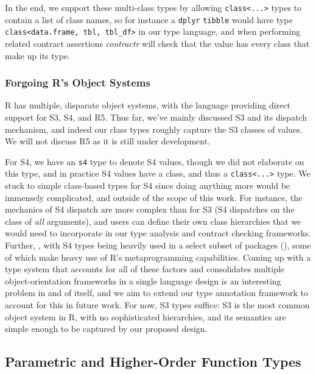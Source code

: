 \documentclass[acmsmall,review,anonymous]{acmart}\settopmatter{printfolios=true,printccs=false,printacmref=false}
\newcommand{\code}[1]{{\lstinline[style=Rin]!#1!}\xspace}
\newcommand{\contractr}{\emph{contractr}\xspace} %
\begin{document}
In the end, we support these multi-class types by allowing \code{class<...>} types to contain a list of class names, so for instance a \code{dplyr} \code{tibble} would have type \code{class<data.frame, tbl, tbl_df>} in our type language, and when performing related contract assertions \contractr will check that the value has every class that make up its type.

%
%
\subsubsection{Forgoing R's Object Systems}

R has multiple, disparate object systems, with the language providing direct
support for S3, S4, and R5.  Thus far, we've mainly discussed S3 and its
dispatch mechanism, and indeed our class types roughly capture the S3
classes of values.  We will not discuss R5 as it is still under
development.

For S4, we have an \code{s4} type to denote S4 values, though we did not elaborate on this type, and in practice S4 values have a class, and thus a \code{class<...>} type.  
We stuck to simple class-based types for S4 since doing anything more would be immensely complicated, and outside of the scope of this work.
For instance, the mechanics of S4 dispatch are more complex than for S3 (S4 dispatches on the class of {\it all} arguments), and users can define their own class hierarchies that we would need to incorporate in our type analysis and contract checking frameworks.  
Further, , with S4 types being heavily used in a select subset of packages (), some of which make heavy use of R's metaprogramming capabilities.  
Coming up with a type system that accounts for all of these factors and consolidates multiple object-orientation frameworks in a single language design is an interesting problem in and of itself, and we aim to extend our type annotation framework to account for this in future work.  
For now, S3 types suffice: S3 is the most common object system in R, with no sophisticated hierarchies, and its semantics are simple enough to be captured by our proposed design.

%
%
%
%
\subsection{Parametric and Higher-Order Function Types}

\end{document}
